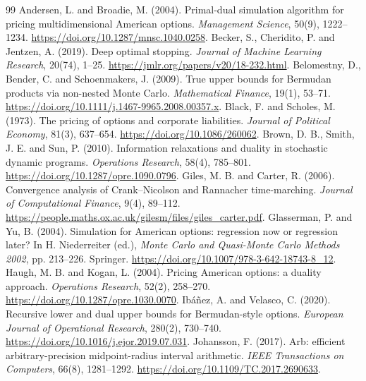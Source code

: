 \documentclass[11pt]{article}
\begin{document}
\clearpage
\begin{thebibliography}{99}
 Andersen, L. and Broadie, M. (2004). Primal-dual simulation algorithm for pricing multidimensional American options. \emph{Management Science}, 50(9), 1222--1234. \url{https://doi.org/10.1287/mnsc.1040.0258}.
 Becker, S., Cheridito, P. and Jentzen, A. (2019). Deep optimal stopping. \emph{Journal of Machine Learning Research}, 20(74), 1--25. \url{https://jmlr.org/papers/v20/18-232.html}.
 Belomestny, D., Bender, C. and Schoenmakers, J. (2009). True upper bounds for Bermudan products via non-nested Monte Carlo. \emph{Mathematical Finance}, 19(1), 53--71. \url{https://doi.org/10.1111/j.1467-9965.2008.00357.x}.
 Black, F. and Scholes, M. (1973). The pricing of options and corporate liabilities. \emph{Journal of Political Economy}, 81(3), 637--654. \url{https://doi.org/10.1086/260062}.
 Brown, D. B., Smith, J. E. and Sun, P. (2010). Information relaxations and duality in stochastic dynamic programs. \emph{Operations Research}, 58(4), 785--801. \url{https://doi.org/10.1287/opre.1090.0796}.
 Giles, M. B. and Carter, R. (2006). Convergence analysis of Crank--Nicolson and Rannacher time-marching. \emph{Journal of Computational Finance}, 9(4), 89--112. \url{https://people.maths.ox.ac.uk/gilesm/files/giles_carter.pdf}.
 Glasserman, P. and Yu, B. (2004). Simulation for American options: regression now or regression later? In H. Niederreiter (ed.), \emph{Monte Carlo and Quasi-Monte Carlo Methods 2002}, pp. 213--226. Springer. \url{https://doi.org/10.1007/978-3-642-18743-8_12}.
 Haugh, M. B. and Kogan, L. (2004). Pricing American options: a duality approach. \emph{Operations Research}, 52(2), 258--270. \url{https://doi.org/10.1287/opre.1030.0070}.
 Ib\'a\~nez, A. and Velasco, C. (2020). Recursive lower and dual upper bounds for Bermudan-style options. \emph{European Journal of Operational Research}, 280(2), 730--740. \url{https://doi.org/10.1016/j.ejor.2019.07.031}.
 Johansson, F. (2017). Arb: efficient arbitrary-precision midpoint-radius interval arithmetic. \emph{IEEE Transactions on Computers}, 66(8), 1281--1292. \url{https://doi.org/10.1109/TC.2017.2690633}.

\end{thebibliography}
\end{document}
